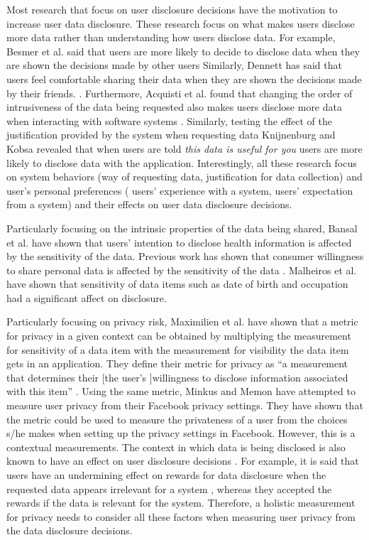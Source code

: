 \documentclass[conference]{IEEEtran}
\begin{document}
Most research that focus on user disclosure decisions have the motivation to increase user data disclosure. These research focus on what makes users disclose more data rather than understanding how users disclose data. For example, Besmer et al. said that users are more likely to decide to disclose data when they are shown the decisions made by other users \cite {besmer2010impact} Similarly, Dennett has said that users feel comfortable sharing their data when they are shown the decisions made by their friends. \cite {dennett2000little}. Furthermore, Acquisti et al. found that changing the order of intrusiveness of the data being requested also makes users disclose more data when interacting with software systems \cite {acquisti2012impact}. Similarly, testing the effect of the justification provided by the system when requesting data Knijnenburg and Kobsa \cite {knijnenburg2013helping} revealed that when users are told \textit{this data is useful for you} users are more likely to disclose data with the application. Interestingly, all these research focus on system behaviors (way of requesting data, justification for data collection) and user's personal preferences ( users' experience with a system, users' expectation from a system) and their effects on user data disclosure decisions.

Particularly focusing on the intrinsic properties of the data being shared, Bansal et al. have shown that users' intention to disclose health information is affected by the sensitivity of the data\cite {bansal2010impact}. Previous work has shown that consumer willingness to share personal data is affected by the sensitivity of the data \cite {malhotra2004internet}. Malheiros et al. \cite {malheiros2013fairly} have shown that sensitivity of data items such as date of birth and occupation had a significant affect on disclosure. 

Particularly focusing on privacy risk, Maximilien et al. \cite {maximilien2009privacy} have shown that a metric for privacy in a given context can be obtained by multiplying the measurement for sensitivity of a data item with the measurement for visibility the data item gets in an application. They define their metric for privacy as \enquote{a measurement that determines their [the user's ]willingness to disclose information associated with this item} \cite {maximilien2009privacy}. Using the same metric, Minkus and Memon \cite{minkus2014scale} have attempted to measure user privacy from their Facebook privacy settings. They have shown that the metric could be used to measure the privateness of a user from the choices s/he makes when setting up the privacy settings in Facebook. However, this is a contextual measurements. The context in which data is being disclosed \cite {nissenbaum2009privacy, john2010strangers} is also known to have an effect on user disclosure decisions \cite {knijnenburg2013making}. For example, it is said that users have an undermining effect on rewards for data disclosure when the requested data appears irrelevant for a system \cite {li2010understanding}, whereas they accepted the rewards if the data is relevant for the system. Therefore, a holistic measurement for privacy needs to consider all these factors when measuring user privacy from the data disclosure decisions. 
\end{document}
